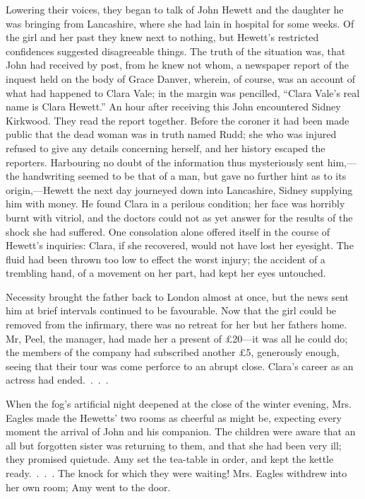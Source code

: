Lowering their voices, they began to talk of John Hewett and the
daughter he was bringing from Lancashire, where she had lain in hospital
for some weeks. Of the girl and her past they knew next to nothing, but
Hewett's restricted confidences suggested disagreeable things. The truth
of the situation was, that John had received by post, from he knew not
whom, a newspaper report of the inquest held on the body of Grace
Danver, wherein, of course, was an account of what {}had happened to
Clara Vale; in the margin was pencilled, ``Clara Vale's real name is
Clara Hewett.'' An hour after receiving this John encountered Sidney
Kirkwood. They read the report together. Before the coroner it had been
made public that the dead woman was in truth named Rudd; she who was
injured refused to give any details concerning herself, and her history
escaped the reporters. Harbouring no doubt of the information thus
mysteriously sent him,---the handwriting seemed to be that of a man, but
gave no further hint as to its origin,---Hewett the next day journeyed
down into Lancashire, Sidney supplying him with money. He found Clara in
a perilous condition; her face was horribly burnt with vitriol, and the
doctors could not as yet answer for the results of the shock she had
suffered. One consolation alone offered itself in the course of Hewett's
inquiries: Clara, if she recovered, would not have lost her eyesight.
The fluid had been thrown too low to effect the worst injury; the
accident of a trembling hand, of a movement on her part, had kept her
eyes untouched.

{}Necessity brought the father back to London almost at once, but the
news sent him at brief intervals continued to be favourable. Now that
the girl could be removed from the infirmary, there was no retreat for
her but her fathers home. Mr, Peel, the manager, had made her a present
of £20---it was all he could do; the members of the company had
subscribed another £5, generously enough, seeing that their tour was
come perforce to an abrupt close. Clara's career as an actress had
ended{.~.~.~.}

When the fog's artificial night deepened at the close of the winter
evening, Mrs. Eagles made the Hewetts' two rooms as cheerful as might
be, expecting every moment the arrival of John and his companion. The
children were aware that an all but forgotten sister was returning to
them, and that she had been very ill; they promised quietude. Amy set
the tea-table in order, and kept the kettle ready{.~.~.~.} The knock for
which they were waiting! Mrs. Eagles withdrew into her own room; Amy
went to the door.

